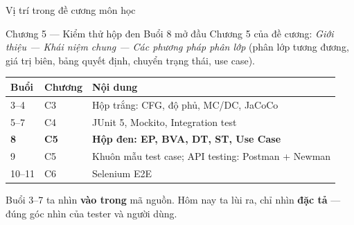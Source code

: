 \documentclass[aspectratio=169,12pt]{beamer}
\begin{document}
\begin{frame}{Vị trí trong đề cương môn học}
  \begin{block}{Chương 5 --- Kiểm thử hộp đen}
    Buổi 8 mở đầu Chương 5 của đề cương: \textit{Giới thiệu --- Khái niệm chung ---
    Các phương pháp phân lớp} (phân lớp tương đương, giá trị biên, bảng quyết định,
    chuyển trạng thái, use case).
  \end{block}

  \vspace{0.3em}
  \begin{center}
  \small
  \begin{tabular}{lll}
    \toprule
    \textbf{Buổi} & \textbf{Chương} & \textbf{Nội dung} \\
    \midrule
    3--4 & C3 & Hộp trắng: CFG, độ phủ, MC/DC, JaCoCo \\
    5--7 & C4 & JUnit 5, Mockito, Integration test \\
    \textbf{8} & \textbf{C5} & \textbf{Hộp đen: EP, BVA, DT, ST, Use Case} \\
    9 & C5 & Khuôn mẫu test case; API testing: Postman + Newman \\
    10--11 & C6 & Selenium E2E \\
    \bottomrule
  \end{tabular}
  \end{center}

  \vspace{0.3em}
  {\small Buổi 3--7 ta nhìn \textbf{vào trong} mã nguồn. Hôm nay ta lùi ra,
  chỉ nhìn \textbf{đặc tả} --- đúng góc nhìn của tester và người dùng.}
\end{frame}
\end{document}
